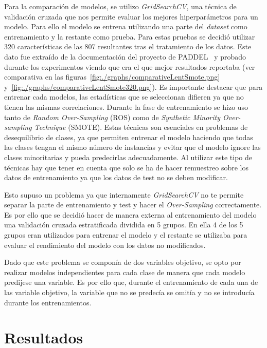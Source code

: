 Para la comparación de modelos, se utilizo \textit{GridSearchCV}, una técnica de validación cruzada que nos permite evaluar los mejores hiperparámetros para un modelo. Para ello el modelo se entrena utilizando una parte del \textit{dataset} como entrenamiento y la restante como prueba. Para estas pruebas se decidió utilizar 320 características de las 807 resultantes tras el tratamiento de los datos. Este dato fue extraído de la documentación del proyecto de PADDEL~\cite{paddelRepo} y probado durante los experimentos viendo que era el que mejor resultados reportaba (ver comparativa en las figuras~\ref{fig:./graphs/comparativeLentSmote.png} y~\ref{fig:./graphs/comparativeLentSmote320.png}). Es importante destacar que para entrenar cada modelos, las estadísticas que se seleccionan difieren ya que no tienen las mismas correlaciones.
Durante la fase de entrenamiento se hizo uso tanto de \textit{Random Over-Sampling} (ROS) como de \textit{Synthetic Minority Over-sampling Technique} (SMOTE). Estas técnicas son esenciales en problemas de desequilibrio de clases, ya que permiten entrenar el modelo haciendo que todas las clases tengan el mismo número de instancias y evitar que el modelo ignore las clases minoritarias y pueda predecirlas adecuadamente. Al utilizar este tipo de técnicas hay que tener en cuenta que solo se ha de hacer remuestreo sobre los datos de entrenamiento ya que los datos de test no se deben modificar. 

Esto supuso un problema ya que internamente \textit{GridSearchCV} no te permite separar la parte de entrenamiento y test y hacer el \textit{Over-Sampling} correctamente. Es por ello que se decidió hacer de manera externa al entrenamiento del modelo una validación cruzada estratificada dividida en 5 grupos. En ella 4 de los 5 grupos eran utilizados para entrenar el modelo y el restante se utilizaba para evaluar el rendimiento del modelo con los datos no modificados.

Dado que este problema se componía de dos variables objetivo, se opto por realizar modelos independientes para cada clase de manera que cada modelo predijese una variable. Es por ello que, durante el entrenamiento de cada una de las variable objetivo, la variable que no se predecía se omitía y no se introducía durante los entrenamientos.

\section{Resultados}
\label{Resultados}

